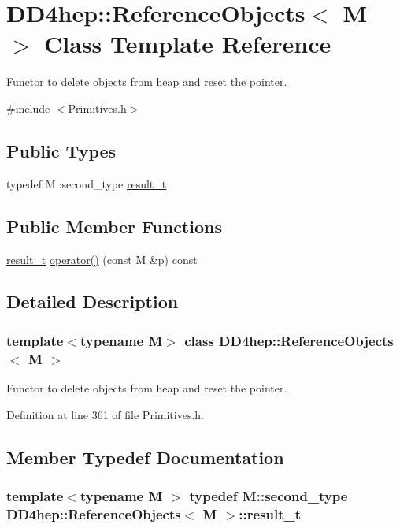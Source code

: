 \hypertarget{class_d_d4hep_1_1_reference_objects}{
\section{DD4hep::ReferenceObjects$<$ M $>$ Class Template Reference}
\label{class_d_d4hep_1_1_reference_objects}
}


Functor to delete objects from heap and reset the pointer.  


{\ttfamily \#include $<$Primitives.h$>$}\subsection*{Public Types}
\begin{DoxyCompactItemize}
\item 
typedef M::second\_\-type \hyperlink{class_d_d4hep_1_1_reference_objects_a32009de947d7ac402ba08bf9a626c5aa}{result\_\-t}
\end{DoxyCompactItemize}
\subsection*{Public Member Functions}
\begin{DoxyCompactItemize}
\item 
\hyperlink{class_d_d4hep_1_1_reference_objects_a32009de947d7ac402ba08bf9a626c5aa}{result\_\-t} \hyperlink{class_d_d4hep_1_1_reference_objects_a286d5f305ade999bc0c55274d5937944}{operator()} (const M \&p) const 
\end{DoxyCompactItemize}


\subsection{Detailed Description}
\subsubsection*{template$<$typename M$>$ class DD4hep::ReferenceObjects$<$ M $>$}

Functor to delete objects from heap and reset the pointer. 

Definition at line 361 of file Primitives.h.

\subsection{Member Typedef Documentation}
\hypertarget{class_d_d4hep_1_1_reference_objects_a32009de947d7ac402ba08bf9a626c5aa}{
\subsubsection[{result\_\-t}]{\setlength{\rightskip}{0pt plus 5cm}template$<$typename M $>$ typedef M::second\_\-type {\bf DD4hep::ReferenceObjects}$<$ M $>$::{\bf result\_\-t}}}
\label{class_d_d4hep_1_1_reference_objects_a32009de947d7ac402ba08bf9a626c5aa}



